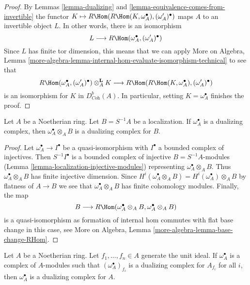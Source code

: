 \begin{proof}
By Lemmas \ref{lemma-dualizing} and
\ref{lemma-equivalence-comes-from-invertible} the functor
$K \mapsto R\Hom(R\Hom(K, \omega_A^\bullet), (\omega_A')^\bullet)$
maps $A$ to an invertible object $L$. In other words, there is
an isomorphism
$$
L \longrightarrow R\Hom(\omega_A^\bullet, (\omega_A')^\bullet)
$$
Since $L$ has finite tor dimension, this means that we can apply
More on Algebra, Lemma
\ref{more-algebra-lemma-internal-hom-evaluate-isomorphism-technical}
to see that
$$
R\Hom(\omega_A^\bullet, (\omega'_A)^\bullet) \otimes_A^\mathbf{L} K
\longrightarrow
R\Hom(R\Hom(K, \omega_A^\bullet), (\omega_A')^\bullet)
$$
is an isomorphism for $K$ in $D^b_{\textit{Coh}}(A)$.
In particular, setting $K = \omega_A^\bullet$ finishes the proof.
\end{proof}

\begin{lemma}
\label{lemma-dualizing-localize}
Let $A$ be a Noetherian ring. Let $B = S^{-1}A$ be a localization.
If $\omega_A^\bullet$ is a dualizing
complex, then $\omega_A^\bullet \otimes_A B$ is a dualizing
complex for $B$.
\end{lemma}

\begin{proof}
Let $\omega_A^\bullet \to I^\bullet$ be a quasi-isomorphism
with $I^\bullet$ a bounded complex of injectives.
Then $S^{-1}I^\bullet$ is a bounded complex of injective
$B = S^{-1}A$-modules (Lemma \ref{lemma-localization-injective-modules})
representing $\omega_A^\bullet \otimes_A B$.
Thus $\omega_A^\bullet \otimes_A B$ has finite injective dimension.
Since $H^i(\omega_A^\bullet \otimes_A B) = H^i(\omega_A^\bullet) \otimes_A B$
by flatness of $A \to B$ we see that $\omega_A^\bullet \otimes_A B$
has finite cohomology modules. Finally, the map
$$
B \longrightarrow
R\Hom(\omega_A^\bullet \otimes_A B, \omega_A^\bullet \otimes_A B)
$$
is a quasi-isomorphism as formation of internal hom commutes with
flat base change in this case, see
More on Algebra, Lemma \ref{more-algebra-lemma-base-change-RHom}.
\end{proof}

\begin{lemma}
\label{lemma-dualizing-glue}
Let $A$ be a Noetherian ring. Let $f_1, \ldots, f_n \in A$
generate the unit ideal. If $\omega_A^\bullet$ is a complex
of $A$-modules such that $(\omega_A^\bullet)_{f_i}$ is a dualizing
complex for $A_{f_i}$ for all $i$, then $\omega_A^\bullet$ is a dualizing
complex for $A$.
\end{lemma}

